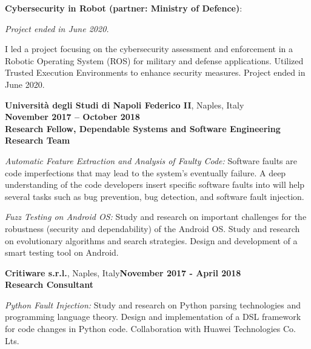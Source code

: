 \documentclass[margin,line]{resume}
\begin{document}
\begin{resume}
\begin{list2}
	\item \filbreak\textbf{Cybersecurity in Robot (partner: Ministry of Defence)}: 
	
	\emph{Project ended in June 2020.}	
		
	I led a project focusing on the cybersecurity assessment and enforcement in a Robotic Operating System (ROS) for military and defense applications. Utilized Trusted Execution Environments to enhance security measures. Project ended in June 2020.

\end{list2}



\textbf{Universit\`a degli Studi di Napoli Federico II}, Naples, Italy\\ \phantom{.} \hfill \textbf{November 2017 -- October 2018}\\
\textbf{Research Fellow, Dependable Systems and Software Engineering Research Team}\hfill 
\vspace{-3mm}\\\vspace{-1mm}
\begin{list2}
	\item \filbreak\textit{Automatic Feature Extraction and Analysis of Faulty Code:} Software faults are code imperfections that may lead to the system's eventually failure. A deep understanding of the code developers insert specific software faults into will help several tasks such as bug prevention, bug detection, and software fault injection.
    \item \filbreak\textit{Fuzz Testing on Android OS:} Study and research on important challenges for the robustness (security and dependability) of the Android OS. Study and research on evolutionary algorithms and search strategies. Design and development of a smart testing tool on Android.
\end{list2}

\textbf{Critiware s.r.l.}, Naples, Italy\hfill\textbf{November 2017 - April 2018}\\
\textbf{Research Consultant}\hfill 
\vspace{-3mm}\\\vspace{-1mm}
\begin{list2}
	\item \filbreak\textit{Python Fault Injection:} Study and research on Python parsing technologies and programming language theory. Design and implementation of a DSL framework for code changes in Python code. Collaboration with Huawei Technologies Co. Lts.
\end{list2}


\end{resume}
\end{document}
